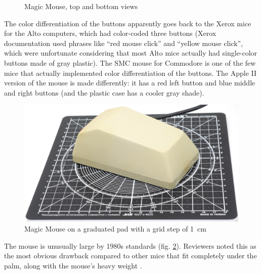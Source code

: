 \documentclass[11pt, a4paper]{article}
\begin{document}
\begin{figure}[h]
    \caption{Magic Mouse, top and bottom views}
    \label{fig:MagicMouseTopAndBottom}
\end{figure}

The color differentiation of the buttons apparently goes back to the Xerox mice for the Alto computers, which had color-coded three buttons (Xerox documentation used phrases like ``red mouse click'' and ``yellow mouse click'', which were unfortunate considering that most Alto mice actually had single-color buttons made of gray plastic). The SMC mouse for Commodore is one of the few mice that actually implemented color differentiation of the buttons. The Apple II version of the mouse is made differently: it has a red left button and blue middle and right buttons (and the plastic case has a cooler gray shade).

\begin{figure}[h]
    \centering
    \includegraphics[scale=0.54]{1985_smc_contriver_magic_mouse/size_30.jpg}
    \caption{Magic Mouse on a graduated pad with a grid step of 1~cm}
    \label{fig:MagicMouseSize}
\end{figure}

The mouse is unusually large by 1980s standards (fig. \ref{fig:MagicMouseSize}). Reviewers noted this as the most obvious drawback compared to other mice that fit completely under the palm, along with the mouse's heavy weight \cite{SMC_Mouse_Commodore3}.
\end{document}
